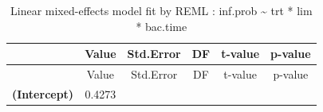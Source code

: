 \documentclass[]{article}
\begin{document}
\begin{longtable}[]{@{}cccccc@{}}
\caption{Linear mixed-effects model fit by REML : inf.prob
\textasciitilde{} trt * lim * bac.time}\tabularnewline
\toprule
\begin{minipage}[b]{0.23\columnwidth}\centering\strut
~\strut
\end{minipage} & \begin{minipage}[b]{0.12\columnwidth}\centering\strut
Value\strut
\end{minipage} & \begin{minipage}[b]{0.14\columnwidth}\centering\strut
Std.Error\strut
\end{minipage} & \begin{minipage}[b]{0.06\columnwidth}\centering\strut
DF\strut
\end{minipage} & \begin{minipage}[b]{0.12\columnwidth}\centering\strut
t-value\strut
\end{minipage} & \begin{minipage}[b]{0.12\columnwidth}\centering\strut
p-value\strut
\end{minipage}\tabularnewline
\midrule
\endfirsthead
\toprule
\begin{minipage}[b]{0.23\columnwidth}\centering\strut
~\strut
\end{minipage} & \begin{minipage}[b]{0.12\columnwidth}\centering\strut
Value\strut
\end{minipage} & \begin{minipage}[b]{0.14\columnwidth}\centering\strut
Std.Error\strut
\end{minipage} & \begin{minipage}[b]{0.06\columnwidth}\centering\strut
DF\strut
\end{minipage} & \begin{minipage}[b]{0.12\columnwidth}\centering\strut
t-value\strut
\end{minipage} & \begin{minipage}[b]{0.12\columnwidth}\centering\strut
p-value\strut
\end{minipage}\tabularnewline
\midrule
\endhead
\begin{minipage}[t]{0.23\columnwidth}\centering\strut
\textbf{(Intercept)}\strut
\end{minipage} & \begin{minipage}[t]{0.12\columnwidth}\centering\strut
0.4273\strut
\end{minipage} & \begin{minipage}[t]{0.14\columnwidth}\centering\strut

\end{minipage}
\end{longtable}
\end{document}
